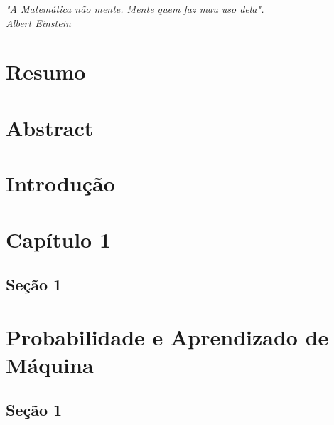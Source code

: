 \documentclass[12pt, a4paper]{report}
\begin{document}
\newpage
\vspace*{20cm}
\begin{flushright}
\begin{minipage}{7cm}
\begin{flushright}
\textit{
"A Matemática não mente. Mente quem faz mau uso dela". \\
Albert Einstein}
\end{flushright}
\end{minipage}
\end{flushright}


\newpage
\chapter*{Resumo}
\thispagestyle{empty}



\newpage
\chapter*{Abstract}
\thispagestyle{empty}


\newpage
\tableofcontents
\thispagestyle{empty}


\chapter*{Introdução}
\pagestyle{myheadings}
\setcounter{page}{1}



\chapter{Capítulo 1}
	

\section{Seção 1}



\chapter{Probabilidade e Aprendizado de Máquina}
	

\section{Seção 1}
\end{document}
